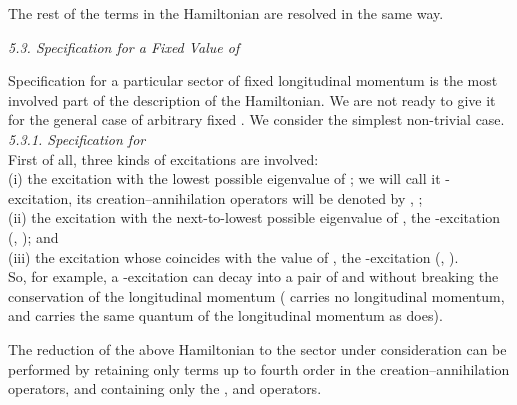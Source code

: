 \documentclass[a4paper,12pt]{article}
\begin{document}
The rest of the terms in the Hamiltonian are
resolved in the same way.\\


\vspace{.3cm}

{\it 5.3. Specification for a Fixed Value of \coordHE{}  }\\
\vspace{.3cm}

Specification for a particular sector of fixed longitudinal 
momentum is the most involved part of the description 
of the Hamiltonian. We are not ready to give it for 
the general case of arbitrary fixed \coordHE{}. We consider the simplest 
non-trivial case.\\

{\it  5.3.1. Specification for \coordHE{} }\\

First of all, three kinds of excitations are involved: \\
 
(i) the excitation with the 
lowest possible eigenvalue of 
\coordHE{};  we will call it \coordHE{}-excitation, its 
creation--annihilation operators will be denoted by 
\coordHE{}, \coordHE{}; \\

(ii) the excitation with the next-to-lowest possible eigenvalue 
of \coordHE{}, the \coordHE{}-excitation (\coordHE{}, \coordHE{}); and \\

(iii) the excitation whose \coordHE{} coincides with the value 
of \coordHE{}, the \coordHE{}-excitation (\coordHE{}, \coordHE{}). \\

So, for example, a \coordHE{}-excitation can decay into a pair of \coordHE{} 
and \coordHE{} without breaking the conservation of the longitudinal 
momentum (\coordHE{} carries no longitudinal momentum, and 
\coordHE{} carries the same quantum of the longitudinal 
momentum \coordHE{} as \coordHE{} does).  

The reduction of the above Hamiltonian to the sector under 
consideration can be performed by retaining only terms up 
to fourth order in the creation--annihilation 
operators, and containing only the \coordHE{}, \coordHE{} and \coordHE{} operators.
\end{document}
